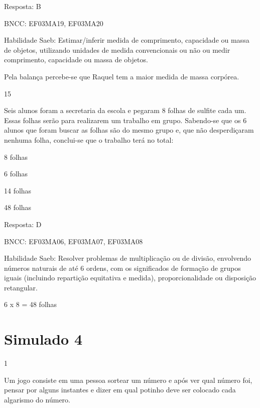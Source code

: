\begin{escolha}
Resposta: B

BNCC: EF03MA19, EF03MA20

Habilidade Saeb: Estimar/inferir medida de comprimento, capacidade ou
massa de objetos, utilizando unidades de medida convencionais ou não ou
medir comprimento, capacidade ou massa de objetos.

Pela balança percebe-se que Raquel tem a maior medida de massa corpórea.

\num{15}

Seis alunos foram a secretaria da escola e pegaram 8 folhas de sulfite
cada um. Essas folhas serão para realizarem um trabalho em grupo.
Sabendo-se que os 6 alunos que foram buscar as folhas são do mesmo grupo
e, que não desperdiçaram nenhuma folha, conclui-se que o trabalho terá
no total:

\begin{escolha}

\item
  8 folhas
\item
  6 folhas
\item
  14 folhas
\item
  48 folhas
\end{escolha}

Resposta: D

BNCC: EF03MA06, EF03MA07, EF03MA08

Habilidade Saeb: Resolver problemas de multiplicação ou de divisão,
envolvendo números naturais de até 6 ordens, com os significados de
formação de grupos iguais (incluindo repartição equitativa e medida),
proporcionalidade ou disposição retangular.

6 x 8 = 48 folhas

\chapter{Simulado 4}

\num{1}

Um jogo consiste em uma pessoa sortear um número e após ver qual número
foi, pensar por alguns instantes e dizer em qual potinho deve ser
colocado cada algarismo do número.


\end{escolha}
